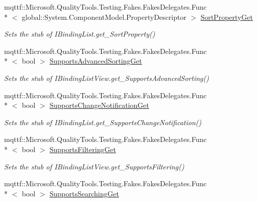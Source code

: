 \begin{DoxyCompactItemize}
mqttf\-::\-Microsoft.\-Quality\-Tools.\-Testing.\-Fakes.\-Fakes\-Delegates.\-Func\\*
$<$ global\-::\-System.\-Component\-Model.\-Property\-Descriptor $>$ \hyperlink{class_system_1_1_component_model_1_1_fakes_1_1_stub_i_binding_list_view_a1e7923bce76c59a451065294191d1a2e}{Sort\-Property\-Get}
\begin{DoxyCompactList}\small\item\em Sets the stub of I\-Binding\-List.\-get\-\_\-\-Sort\-Property()\end{DoxyCompactList}\item 
mqttf\-::\-Microsoft.\-Quality\-Tools.\-Testing.\-Fakes.\-Fakes\-Delegates.\-Func\\*
$<$ bool $>$ \hyperlink{class_system_1_1_component_model_1_1_fakes_1_1_stub_i_binding_list_view_ac189000bd7db9c82540b516d34eac225}{Supports\-Advanced\-Sorting\-Get}
\begin{DoxyCompactList}\small\item\em Sets the stub of I\-Binding\-List\-View.\-get\-\_\-\-Supports\-Advanced\-Sorting()\end{DoxyCompactList}\item 
mqttf\-::\-Microsoft.\-Quality\-Tools.\-Testing.\-Fakes.\-Fakes\-Delegates.\-Func\\*
$<$ bool $>$ \hyperlink{class_system_1_1_component_model_1_1_fakes_1_1_stub_i_binding_list_view_a99cfbc872f06d13ccbacc59033f1bda5}{Supports\-Change\-Notification\-Get}
\begin{DoxyCompactList}\small\item\em Sets the stub of I\-Binding\-List.\-get\-\_\-\-Supports\-Change\-Notification()\end{DoxyCompactList}\item 
mqttf\-::\-Microsoft.\-Quality\-Tools.\-Testing.\-Fakes.\-Fakes\-Delegates.\-Func\\*
$<$ bool $>$ \hyperlink{class_system_1_1_component_model_1_1_fakes_1_1_stub_i_binding_list_view_a507f1138be69e518891ac4c4a6c170db}{Supports\-Filtering\-Get}
\begin{DoxyCompactList}\small\item\em Sets the stub of I\-Binding\-List\-View.\-get\-\_\-\-Supports\-Filtering()\end{DoxyCompactList}\item 
mqttf\-::\-Microsoft.\-Quality\-Tools.\-Testing.\-Fakes.\-Fakes\-Delegates.\-Func\\*
$<$ bool $>$ \hyperlink{class_system_1_1_component_model_1_1_fakes_1_1_stub_i_binding_list_view_a05228aca6f18727251468e27bbcb3a1f}{Supports\-Searching\-Get}

\end{DoxyCompactItemize}
